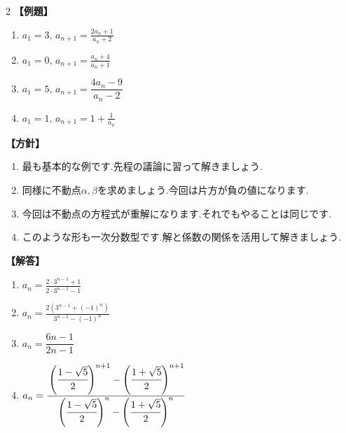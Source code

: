 \documentclass[dvipdfmx,a4paper,11pt,fleqn,openany]{jsbook}
\begin{document}
\begin{multicols*}{2}
      \noindent \textbf{【例題】}
      \begin{enumerate}[label=(\arabic*),parsep=3pt]
        \item $\displaystyle a_1=3,\, a_{n+1}=\frac{2a_n+1}{a_n+2}$
        \item $\displaystyle a_1=0,\, a_{n+1}=\frac{a_n+4}{a_n+1}$
        \item $\displaystyle a_1=5,\, a_{n+1}=\dfrac{4a_{n}-9}{a_{n}-2}$
        \item $\displaystyle a_1=1,\, a_{n+1}=1+\frac{1}{a_n}$
      \end{enumerate}

      \noindent\textbf{【方針】}
      \begin{enumerate}[label=(\arabic*),parsep=3pt]
        \item 最も基本的な例です.先程の議論に習って解きましょう.
        \item 同様に不動点$\alpha,\beta$を求めましょう.今回は片方が負の値になります.
        \item 今回は不動点の方程式が重解になります.それでもやることは同じです.
        \item このような形も一次分数型です.解と係数の関係を活用して解きましょう.
      \end{enumerate}

      \noindent\textbf{【解答】}
      \begin{enumerate}[label=(\arabic*),parsep=3pt]
        \item $\displaystyle a_n=\frac{2\cdot3^{n-1}+1}{2\cdot3^{n-1}-1}$
        \item $\displaystyle a_n=\frac{2\left(3^{n-1}+(-1)^n\right)}{3^{n-1}-(-1)^n}$
        \item $a_{n}=\dfrac{6n-1}{2n-1}$
        \item $\displaystyle a_n=\cfrac{\left(\cfrac{1-\sqrt{5}}{2}\right)^{n+1}-\left(\cfrac{1+\sqrt{5}}{2}\right)^{n+1}}{\left(\cfrac{1-\sqrt{5}}{2}\right)^n-\left(\cfrac{1+\sqrt{5}}{2}\right)^n}$
      \end{enumerate}


\end{multicols*}
\end{document}
